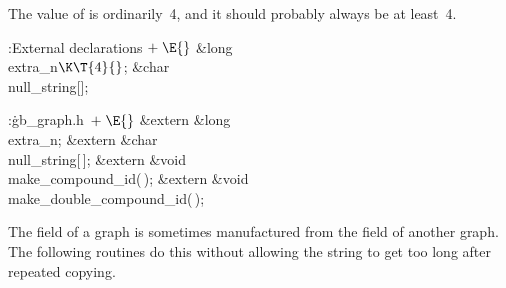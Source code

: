 The value of  is ordinarily~4, and it should probably
always be at
least~4.

\Y\B\4:External declarations\X${}\mathrel+\E{}$\6
\&{long} \\{extra\_n}${}\K\T{4}{}$;\6
\&{char} \\{null\_string}[];\par
\fi

\B{}:\.{gb\_graph.h\,}\X${}\mathrel+\E{}$\6
\&{extern} \&{long} \\{extra\_n};\6
\&{extern} \&{char} \\{null\_string}[\,];\6
\&{extern} \&{void} \\{make\_compound\_id}(\,);\6
\&{extern} \&{void} \\{make\_double\_compound\_id}(\,);\par
\fi

The  field of a graph is sometimes manufactured from the  field
of another graph. The following routines do this without allowing the
string to get too long after repeated copying.


